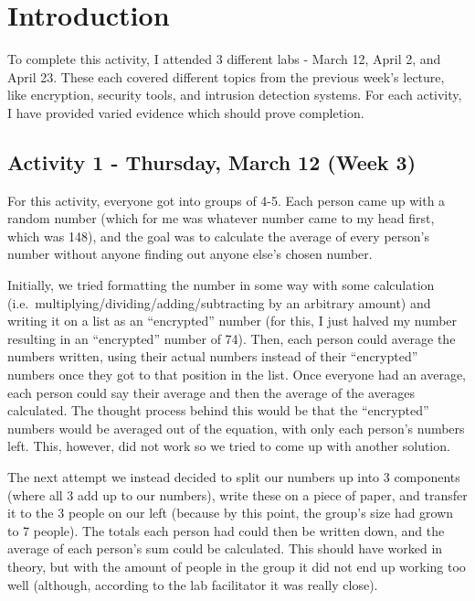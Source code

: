 \hypertarget{introduction}{%
\section{Introduction}\label{introduction}}

To complete this activity, I attended 3 different labs - March 12, April
2, and April 23. These each covered different topics from the previous
week's lecture, like encryption, security tools, and intrusion detection
systems. For each activity, I have provided varied evidence which should
prove completion.

\hypertarget{activity-1---thursday-march-12-week-3}{%
\subsection{Activity 1 - Thursday, March 12 (Week
3)}\label{activity-1---thursday-march-12-week-3}}

For this activity, everyone got into groups of 4-5. Each person came up
with a random number (which for me was whatever number came to my head
first, which was 148), and the goal was to calculate the average of
every person's number without anyone finding out anyone else's chosen
number.

Initially, we tried formatting the number in some way with some
calculation (i.e.~multiplying/dividing/adding/subtracting by an
arbitrary amount) and writing it on a list as an ``encrypted'' number
(for this, I just halved my number resulting in an ``encrypted'' number
of 74). Then, each person could average the numbers written, using their
actual numbers instead of their ``encrypted'' numbers once they got to
that position in the list. Once everyone had an average, each person
could say their average and then the average of the averages calculated.
The thought process behind this would be that the ``encrypted'' numbers
would be averaged out of the equation, with only each person's numbers
left. This, however, did not work so we tried to come up with another
solution.

The next attempt we instead decided to split our numbers up into 3
components (where all 3 add up to our numbers), write these on a piece
of paper, and transfer it to the 3 people on our left (because by this
point, the group's size had grown to 7 people). The totals each person
had could then be written down, and the average of each person's sum
could be calculated. This should have worked in theory, but with the
amount of people in the group it did not end up working too well
(although, according to the lab facilitator it was really close).

